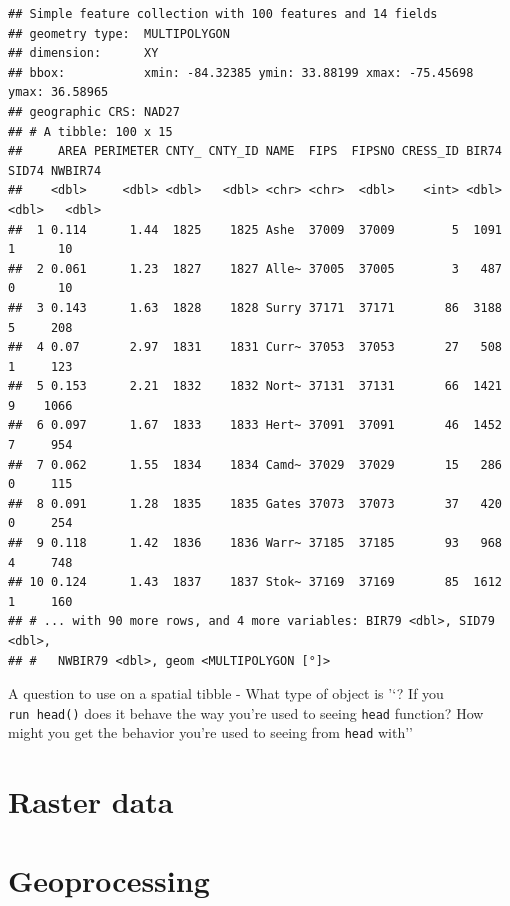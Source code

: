 \documentclass[
]{book}
\newenvironment{Shaded}{\begin{snugshade}}{\end{snugshade}}
\newcommand{\KeywordTok}[1]{\textcolor[rgb]{0.13,0.29,0.53}{\textbf{#1}}}
\newcommand{\NormalTok}[1]{#1}
\newcommand{\OperatorTok}[1]{\textcolor[rgb]{0.81,0.36,0.00}{\textbf{#1}}}
\newcommand{\StringTok}[1]{\textcolor[rgb]{0.31,0.60,0.02}{#1}}
\begin{document}
\begin{Shaded}
\end{Shaded}

\begin{verbatim}
## Simple feature collection with 100 features and 14 fields
## geometry type:  MULTIPOLYGON
## dimension:      XY
## bbox:           xmin: -84.32385 ymin: 33.88199 xmax: -75.45698 ymax: 36.58965
## geographic CRS: NAD27
## # A tibble: 100 x 15
##     AREA PERIMETER CNTY_ CNTY_ID NAME  FIPS  FIPSNO CRESS_ID BIR74 SID74 NWBIR74
##    <dbl>     <dbl> <dbl>   <dbl> <chr> <chr>  <dbl>    <int> <dbl> <dbl>   <dbl>
##  1 0.114      1.44  1825    1825 Ashe  37009  37009        5  1091     1      10
##  2 0.061      1.23  1827    1827 Alle~ 37005  37005        3   487     0      10
##  3 0.143      1.63  1828    1828 Surry 37171  37171       86  3188     5     208
##  4 0.07       2.97  1831    1831 Curr~ 37053  37053       27   508     1     123
##  5 0.153      2.21  1832    1832 Nort~ 37131  37131       66  1421     9    1066
##  6 0.097      1.67  1833    1833 Hert~ 37091  37091       46  1452     7     954
##  7 0.062      1.55  1834    1834 Camd~ 37029  37029       15   286     0     115
##  8 0.091      1.28  1835    1835 Gates 37073  37073       37   420     0     254
##  9 0.118      1.42  1836    1836 Warr~ 37185  37185       93   968     4     748
## 10 0.124      1.43  1837    1837 Stok~ 37169  37169       85  1612     1     160
## # ... with 90 more rows, and 4 more variables: BIR79 <dbl>, SID79 <dbl>,
## #   NWBIR79 <dbl>, geom <MULTIPOLYGON [°]>
\end{verbatim}

A question to use on a spatial tibble - What type of object is '`? If you \texttt{run\ head()} does it behave the way you're used to seeing \texttt{head} function? How might you get the behavior you're used to seeing from \texttt{head} with''

\hypertarget{raster-data}{%
\chapter{Raster data}\label{raster-data}}

\hypertarget{geoprocessing}{%
\chapter{Geoprocessing}\label{geoprocessing}}
\end{document}
